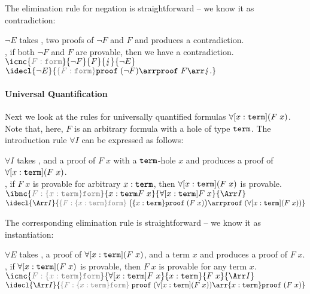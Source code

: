 \noindent
The elimination rule for negation is straightforward -- we know it as contradiction:
\begin{center}
$\neg E$ takes , two proofs of $\neg F$ and $F$ and produces a contradiction.\\[.5cm]
, if both $\neg F$ and $F$ are provable, then we have a contradiction.\\[.5cm]
$\icnc{\implicit{F:\FORM}}{\der \neg F}{\der F}{\der \contra}{\neg E}$\\[.5cm]
$\idecl{\neg E}{\implicit{\{F:\FORM\}}\PROOF\;(\neg F)\arr \PROOF\;F\arr\contra.}$
\end{center}

\paragraph{Universal Quantification}
Next we look at the rules for universally quantified formulas $\forall[x:\mathtt{term}](F\;x)$. Note that, here, $F$ is an arbitrary formula with a hole of type $\mathtt{term}$. The introduction rule $\forall I$ can be expressed as follows:
\begin{center}
$\forall I$ takes , and a proof of $F\;x$ with a $\mathtt{term}$-hole $x$ and produces a proof of $\forall[x:\mathtt{term}](F\;x)$.\\[.5cm]
, if $F\;x$ is provable for arbitrary $x:\mathtt{term}$, then $\forall[x:\mathtt{term}] (F\;x)$ is provable.\\[.5cm]
$\ibnc{\implicit{F:\{x:\TERM\}\FORM}}{x:\TERM\der F\;x}{\der \forall[x:\TERM] F\;x}{\impl I}$\\[.5cm]
$\idecl{\impl I}{\implicit{\{F:\{x:\TERM\}\FORM\}}\;\big(\{x:\TERM\}\PROOF\; (F\;x)\big)\arr \PROOF\;(\forall[x:\TERM](F\;x))}$
\end{center}

\noindent
The corresponding elimination rule is straightforward -- we know it as instantiation:
\begin{center}
$\forall E$ takes , a proof of $\forall[x:\mathtt{term}](F\;x)$, and a term $x$ and produces a proof of $F\;x$.\\[.5cm]
, if $\forall[x:\mathtt{term}](F\;x)$ is provable, then $F\;x$ is provable for any term $x$.\\[.5cm]
$\icnc{\implicit{F:\{x:\TERM\}\FORM}}{\der \forall[x:\TERM] F\;x}{x:\TERM}{\der F\;x}{\impl I}$\\[.5cm]
$\idecl{\impl I}{\implicit{\{F:\{x:\TERM\}\FORM\}}\;\PROOF\;(\forall[x:\TERM](F\;x))\arr \{x:\TERM\}\PROOF\; (F\;x)}$
\end{center}


